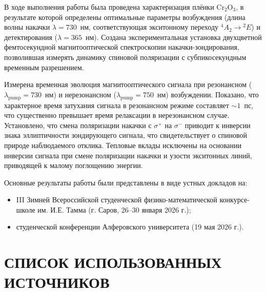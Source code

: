 \documentclass[14pt]{extarticle}
\numberwithin{equation}{section}
\begin{document}
В ходе выполнения работы была проведена характеризация плёнки Cr$_2$O$_3$,
в результате которой определены оптимальные параметры возбуждения
(длина волны накачки $\lambda = 730$~нм, соответствующая экситонному
переходу $^4A_2 \rightarrow {}^2E$) и детектирования ($\lambda = 365$~нм).
Создана экспериментальная установка двухцветной фемтосекундной
магнитооптической спектроскопии накачки-зондирования, позволившая
измерять динамику спиновой поляризации с субпикосекундным временным
разрешением.

Измерена временная эволюция магнитооптического сигнала при резонансном
($\lambda_{\text{pump}} = 730$~нм) и нерезонансном ($\lambda_{\text{pump}} = 750$~нм)
возбуждении. Показано, что характерное время затухания сигнала в резонансном
режиме составляет $\sim1$~пс, что существенно превышает время релаксации
в нерезонансном случае. Установлено, что смена поляризации накачки
с $\sigma^+$ на $\sigma^-$ приводит к инверсии знака эллиптичности
зондирующего сигнала, что свидетельствует о спиновой природе наблюдаемого
отклика. Тепловые вклады исключены на основании инверсии сигнала при смене
поляризации накачки и узости экситонных линий, приводящей к малому поглощению
энергии.

Основные результаты работы были представлены в виде устных докладов на:
\begin{itemize}
    \item III Зимней Всероссийской студенческой физико-математической
          конкурсе-школе им. И.Е. Тамма (г. Саров, 26--30 января 2026 г.);
    \item студенческой конференции Алферовского университета (19 мая 2026 г.).
\end{itemize}











\newpage

\section*{СПИСОК ИСПОЛЬЗОВАННЫХ ИСТОЧНИКОВ}
\printbibliography[heading=none]
\end{document}
